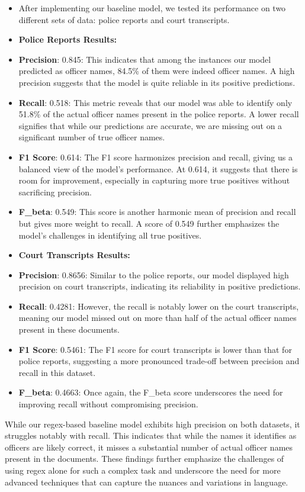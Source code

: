 \documentclass{article}
\begin{document}
\begin{itemize}
    \item After implementing our baseline model, we tested its performance on two different sets of data: police reports and court transcripts.
    \item \textbf{Police Reports Results:}
    \item \textbf{Precision}: 0.845: This indicates that among the instances our model predicted as officer names, 84.5\% of them were indeed officer names. A high precision suggests that the model is quite reliable in its positive predictions.
    \item \textbf{Recall}: 0.518: This metric reveals that our model was able to identify only 51.8\% of the actual officer names present in the police reports. A lower recall signifies that while our predictions are accurate, we are missing out on a significant number of true officer names.
    \item \textbf{F1 Score}: 0.614: The F1 score harmonizes precision and recall, giving us a balanced view of the model's performance. At 0.614, it suggests that there is room for improvement, especially in capturing more true positives without sacrificing precision.
    \item \textbf{F\_beta}: 0.549: This score is another harmonic mean of precision and recall but gives more weight to recall. A score of 0.549 further emphasizes the model's challenges in identifying all true positives.
    \item \textbf{Court Transcripts Results:}
    \item \textbf{Precision}: 0.8656: Similar to the police reports, our model displayed high precision on court transcripts, indicating its reliability in positive predictions.
    \item \textbf{Recall}: 0.4281: However, the recall is notably lower on the court transcripts, meaning our model missed out on more than half of the actual officer names present in these documents.
    \item \textbf{F1 Score}: 0.5461: The F1 score for court transcripts is lower than that for police reports, suggesting a more pronounced trade-off between precision and recall in this dataset.
    \item \textbf{F\_beta}: 0.4663: Once again, the F\_beta score underscores the need for improving recall without compromising precision.
\end{itemize}

While our regex-based baseline model exhibits high precision on both datasets, it struggles notably with recall. This indicates that while the names it identifies as officers are likely correct, it misses a substantial number of actual officer names present in the documents. These findings further emphasize the challenges of using regex alone for such a complex task and underscore the need for more advanced techniques that can capture the nuances and variations in language.
\end{document}
